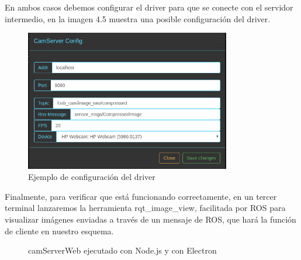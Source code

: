 En ambos casos debemos configurar el driver para que se conecte con el servidor intermedio, en la imagen 4.5 muestra una posible configuración del driver.
\begin{figure}[H]
  \begin{center}
    \includegraphics[width=0.8\textwidth]{figures/configcamservertest.png}
		\caption{Ejemplo de configuración del driver}
		\label{fig.esquemacamserver}
		\end{center}
\end{figure}
Finalmente, para verificar que está funcionando correctamente, en un tercer terminal lanzaremos la herramienta rqt\_image\_view, facilitada por ROS para visualizar imágenes enviadas a través de un mensaje de ROS, que hará la función de cliente en nuestro esquema.
\begin{figure}[H]
  \begin{center}
    \caption{camServerWeb ejecutado con Node.js y con Electron}
     \label{fig.ejecuccioncamserver}
     \end{center}
\end{figure}
